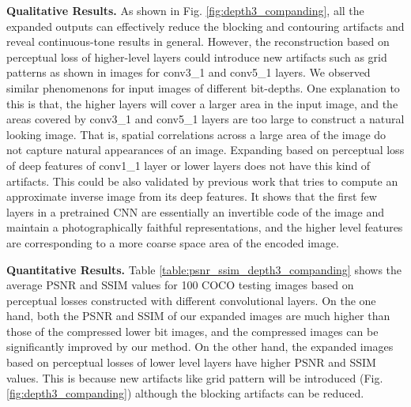 \documentclass[journal]{IEEEtran}
\begin{document}
\textbf{Qualitative Results.}
As shown in Fig. \ref{fig:depth3_companding}, all the expanded outputs can effectively reduce the blocking and contouring artifacts and reveal continuous-tone results in general. However, the reconstruction based on perceptual loss of higher-level layers could introduce new artifacts such as grid patterns as shown in images for conv3\_1 and conv5\_1 layers. We observed similar phenomenons for input images of different bit-depths. One explanation to this is that, the higher layers will cover a larger area in the input image, and the areas covered by conv3\_1 and conv5\_1 layers are too large to construct a natural looking image. That is, spatial correlations across a large area of the image do not capture natural appearances of an image. Expanding based on perceptual loss of deep features of conv1\_1 layer or lower layers does not have this kind of artifacts. This could be also validated by previous work \cite{mahendran2015understanding} that tries to compute an approximate inverse image from its deep features. It shows that the first few layers in a pretrained CNN are essentially an invertible code of the image and maintain a photographically faithful representations, and the higher level features are corresponding to a more coarse space area of the encoded image.


\textbf{Quantitative Results.}
Table \ref{table:psnr_ssim_depth3_companding} shows the average PSNR and SSIM values for 100 COCO testing images based on perceptual losses constructed with different convolutional layers. On the one hand, both the PSNR and SSIM of our expanded images are much higher than those of the compressed lower bit images, and the compressed images can be significantly improved by our method. On the other hand, the expanded images based on perceptual losses of lower level layers have higher PSNR and SSIM values. This is because new artifacts like grid pattern will be introduced (Fig. \ref{fig:depth3_companding}) although the blocking artifacts can be reduced.

\end{document}
